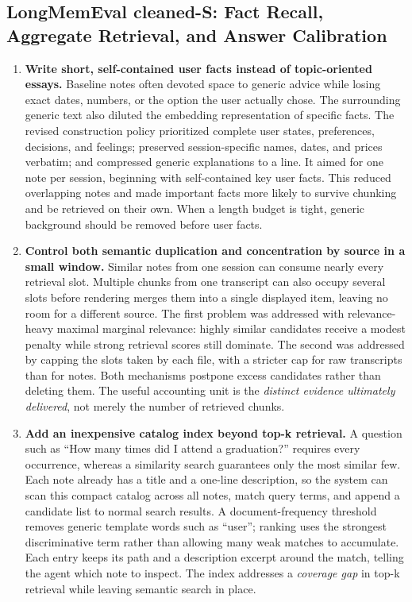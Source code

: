 \subsection{LongMemEval cleaned-S: Fact Recall, Aggregate Retrieval, and Answer Calibration}

\begin{enumerate}
\item \textbf{Write short, self-contained user facts instead of topic-oriented essays.} Baseline notes often devoted space to generic advice while losing exact dates, numbers, or the option the user actually chose. The surrounding generic text also diluted the embedding representation of specific facts. The revised construction policy prioritized complete user states, preferences, decisions, and feelings; preserved session-specific names, dates, and prices verbatim; and compressed generic explanations to a line. It aimed for one note per session, beginning with self-contained key user facts. This reduced overlapping notes and made important facts more likely to survive chunking and be retrieved on their own. When a length budget is tight, generic background should be removed before user facts.

\item \textbf{Control both semantic duplication and concentration by source in a small window.} Similar notes from one session can consume nearly every retrieval slot. Multiple chunks from one transcript can also occupy several slots before rendering merges them into a single displayed item, leaving no room for a different source. The first problem was addressed with relevance-heavy maximal marginal relevance: highly similar candidates receive a modest penalty while strong retrieval scores still dominate. The second was addressed by capping the slots taken by each file, with a stricter cap for raw transcripts than for notes. Both mechanisms postpone excess candidates rather than deleting them. The useful accounting unit is the \emph{distinct evidence ultimately delivered}, not merely the number of retrieved chunks.

\item \textbf{Add an inexpensive catalog index beyond top-k retrieval.} A question such as ``How many times did I attend a graduation?'' requires every occurrence, whereas a similarity search guarantees only the most similar few. Each note already has a title and a one-line description, so the system can scan this compact catalog across all notes, match query terms, and append a candidate list to normal search results. A document-frequency threshold removes generic template words such as ``user''; ranking uses the strongest discriminative term rather than allowing many weak matches to accumulate. Each entry keeps its path and a description excerpt around the match, telling the agent which note to inspect. The index addresses a \emph{coverage gap} in top-k retrieval while leaving semantic search in place.


\end{enumerate}
